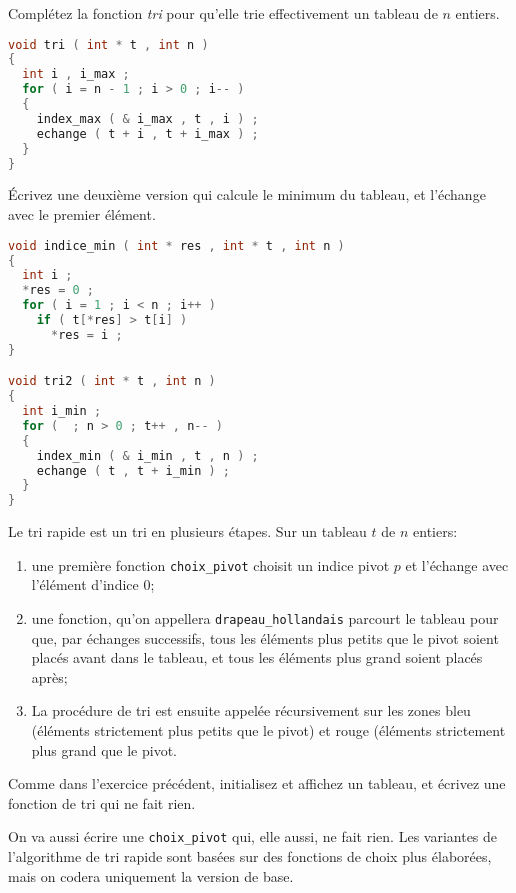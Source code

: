 \question Complétez la fonction \emph{tri} pour qu'elle trie
effectivement un tableau de \(n\) entiers.

\begin{solutioncachee}
  \begin{lstlisting}[language=C]
void tri ( int * t , int n )
{
  int i , i_max ;
  for ( i = n - 1 ; i > 0 ; i-- )
  {
    index_max ( & i_max , t , i ) ;
    echange ( t + i , t + i_max ) ;
  }
}
  \end{lstlisting}
\end{solutioncachee}

\question Écrivez une deuxième version qui calcule le minimum du
tableau, et l'échange avec le premier élément.

\begin{solutioncachee}
  \begin{lstlisting}[language=C]
void indice_min ( int * res , int * t , int n )
{
  int i ;
  *res = 0 ;
  for ( i = 1 ; i < n ; i++ )
    if ( t[*res] > t[i] )
      *res = i ;
}

void tri2 ( int * t , int n )
{
  int i_min ;
  for (  ; n > 0 ; t++ , n-- )
  {
    index_min ( & i_min , t , n ) ;
    echange ( t , t + i_min ) ;
  }
}
  \end{lstlisting}
\end{solutioncachee}


Le tri rapide est un tri en plusieurs étapes. Sur un tableau \(t\) de
\(n\) entiers:
\begin{enumerate}
\item une première fonction \texttt{choix\_pivot} choisit un indice
  pivot \(p\) et l'échange avec l'élément d'indice \(0\);
\item une fonction, qu'on appellera \texttt{drapeau\_hollandais}
  parcourt le tableau pour que, par échanges successifs, tous les
  éléments plus petits que le pivot soient placés avant dans le
  tableau, et tous les éléments plus grand soient placés après;
\item La procédure de tri est ensuite appelée récursivement sur les
  zones bleu (éléments strictement plus petits que le pivot) et rouge
  (éléments strictement plus grand que le pivot.
\end{enumerate}

\question Comme dans l'exercice précédent, initialisez et affichez un
tableau, et écrivez une fonction de tri qui ne fait rien.

\question On va aussi écrire une \texttt{choix\_pivot} qui, elle
aussi, ne fait rien. Les variantes de l'algorithme de tri rapide sont
basées sur des fonctions de choix plus élaborées, mais on codera
uniquement la version de base.

